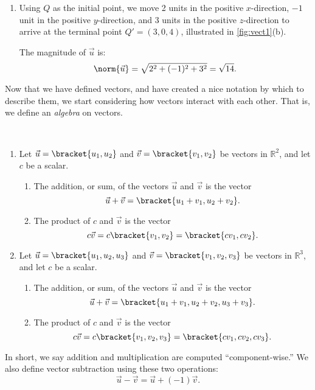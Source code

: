 \begin{example}
\begin{enumerate}
	\item	Using $Q$ as the initial point, we move 2 units in the positive $x$-direction, $-1$ unit in the positive $y$-direction, and 3 units in the positive $z$-direction to arrive at the terminal point $Q' = (3,0,4)$, illustrated in \autoref{fig:vect1}(b).
	
	The magnitude of $\vec u$ is:
	\[\norm{\vec u} = \sqrt{2^2+(-1)^2+3^2} = \sqrt{14}.\]
\end{enumerate}
\end{example}

Now that we have defined vectors, and have created a nice notation by which to describe them, we start considering how vectors interact with each other. That is, we define an \emph{algebra} on vectors.

\begin{definition}\label{def:vector_algebra}
\mbox{}\\[-2\baselineskip]\begin{enumerate}
	\item Let $\vec u =\bracket{u_1,u_2}$ and $\vec v =\bracket{v_1,v_2}$ be vectors in $\mathbb{R}^2$, and let $c$ be a scalar.
		\begin{enumerate}
			\item The addition, or sum, of the vectors $\vec u$ and $\vec v$ is the vector
			\[\vec u+\vec v =\bracket{u_1+v_1, u_2+v_2}.\]
			\item	The product of $c$ and $\vec v$ is the vector 
			\[c\vec v = c\bracket{v_1,v_2}=\bracket{cv_1,cv_2}.\]
		\end{enumerate}
	\item Let $\vec u =\bracket{u_1,u_2,u_3}$ and $\vec v =\bracket{v_1,v_2,v_3}$ be vectors in $\mathbb{R}^3$, and let $c$ be a scalar. 
		\begin{enumerate}
			\item The addition, or sum, of the vectors $\vec u$ and $\vec v$ is the vector
			\[\vec u+\vec v =\bracket{u_1+v_1, u_2+v_2, u_3+v_3}.\]
			\item	The product of $c$ and $\vec v$ is the vector 
			\[c\vec v = c\bracket{v_1,v_2,v_3}=\bracket{cv_1,cv_2,cv_3}.\]
		\end{enumerate}
\end{enumerate}
\end{definition}

In short, we say addition and multiplication are computed ``component-wise.''  We also define vector subtraction using these two operations:
\[\vec u-\vec v = \vec u + (-1)\vec v.\]

